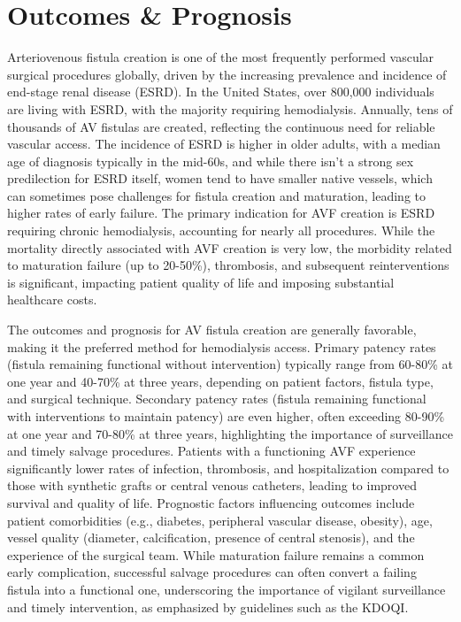 \section*{Outcomes \& Prognosis}
Arteriovenous fistula creation is one of the most frequently performed vascular surgical procedures globally, driven by the increasing prevalence and incidence of end-stage renal disease (ESRD). In the United States, over 800,000 individuals are living with ESRD, with the majority requiring hemodialysis. Annually, tens of thousands of AV fistulas are created, reflecting the continuous need for reliable vascular access. The incidence of ESRD is higher in older adults, with a median age of diagnosis typically in the mid-60s, and while there isn't a strong sex predilection for ESRD itself, women tend to have smaller native vessels, which can sometimes pose challenges for fistula creation and maturation, leading to higher rates of early failure. The primary indication for AVF creation is ESRD requiring chronic hemodialysis, accounting for nearly all procedures. While the mortality directly associated with AVF creation is very low, the morbidity related to maturation failure (up to 20-50\%), thrombosis, and subsequent reinterventions is significant, impacting patient quality of life and imposing substantial healthcare costs.

The outcomes and prognosis for AV fistula creation are generally favorable, making it the preferred method for hemodialysis access. Primary patency rates (fistula remaining functional without intervention) typically range from 60-80\% at one year and 40-70\% at three years, depending on patient factors, fistula type, and surgical technique. Secondary patency rates (fistula remaining functional with interventions to maintain patency) are even higher, often exceeding 80-90\% at one year and 70-80\% at three years, highlighting the importance of surveillance and timely salvage procedures. Patients with a functioning AVF experience significantly lower rates of infection, thrombosis, and hospitalization compared to those with synthetic grafts or central venous catheters, leading to improved survival and quality of life. Prognostic factors influencing outcomes include patient comorbidities (e.g., diabetes, peripheral vascular disease, obesity), age, vessel quality (diameter, calcification, presence of central stenosis), and the experience of the surgical team. While maturation failure remains a common early complication, successful salvage procedures can often convert a failing fistula into a functional one, underscoring the importance of vigilant surveillance and timely intervention, as emphasized by guidelines such as the KDOQI.

